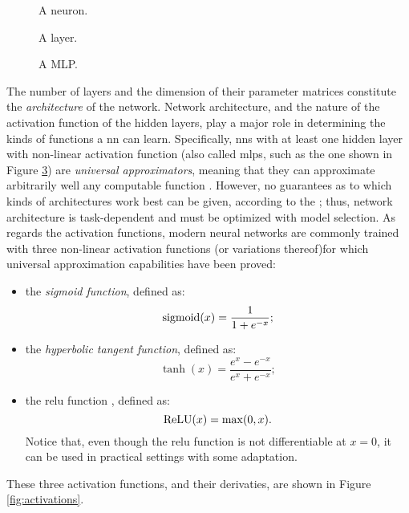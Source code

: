 \begin{figure*}[h!]
    \begin{subfigure}[b]{0.32\linewidth}
        \centering
        \resizebox{.8\textwidth}{!}{}
        \caption{A neuron.}
        \label{fig:neuron}
    \end{subfigure}
    \begin{subfigure}[b]{0.32\linewidth}
        \centering
        \resizebox{.9\textwidth}{!}{}
        \caption{A layer.}
        \label{fig:layer}
    \end{subfigure}
    \begin{subfigure}[b]{0.32\linewidth}
        \centering
        \resizebox{.9\textwidth}{!}{}
        \caption{A MLP.}
        \label{fig:mlp}
    \end{subfigure}
    \caption{({\scriptsize A}) An example of a neural network layer. The superscript above the units indicates the layer they belong to. ({\scriptsize A}) A Multi-Layer Perceptron
    with $L=3$ layers (biases not shown). The arrows indicate the flow of forward propagation.}
\end{figure*}

The number of layers and the dimension of their parameter matrices constitute the \emph{architecture} of the network. Network architecture, and the nature of the activation function of the hidden layers, play a major role in determining the kinds of functions a \gls{nn} can learn. Specifically, \glspl{nn} with at least one hidden layer with non-linear activation function (also called \glspl{mlp}, such as the one shown in Figure \ref{fig:mlp}) are \emph{universal approximators}, meaning that they can approximate arbitrarily well any computable function \citep{cybenko1998approximationuniversal}. However, no guarantees as to which kinds of architectures work best can be given, according to the  \citep{wolpert1997freelunchtheorem}; thus, network architecture is task-dependent and must be optimized with model selection. As regards the activation functions, modern neural networks are commonly trained with three non-linear activation functions (or variations thereof)for which universal approximation capabilities have been proved:
\begin{itemize}
    \item the \emph{sigmoid function}, defined as:
    $$\operatorname{sigmoid}(x) = \frac{1}{1 + e^{-x}};$$
    \item the \emph{hyperbolic tangent function}, defined as:
    $$\tanh(x) = \frac{e^x - e^{-x}}{e^x + e^{-x}};$$
    \item the \gls{relu} function \citep{glorot2011relu}, defined as:
    $$\operatorname{ReLU}(x) = \max(0, x).$$
    Notice that, even though the \gls{relu} function is not differentiable at $x = 0$, it can be used in practical settings with some adaptation.
\end{itemize}
These three activation functions, and their derivaties, are shown in Figure \ref{fig:activations}.

